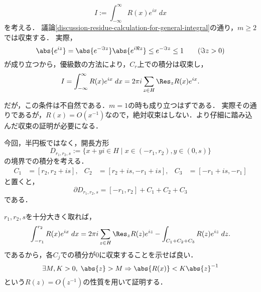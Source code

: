 \documentclass[uplatex, dvipdfmx]{jsreport}
\begin{document}
\begin{discussion}[$R=O(x^{-1})$の時]\label{discussion-general-integral-case-O(n^-1)}
    \[I:=\int^\infty_{-\infty}R(x)e^{ix}\;dx\]
    を考える．
    議論\ref{discussion-residue-calculation-for-general-integral}の通り，$m\ge 2$
    では収束する．
    実際，
    \[\abs{e^{iz}}=\abs{e^{-\Im z}}\abs{e^{i\Re z}}\le e^{-\Im z}\le 1\qquad(\Im z>0)\]
    が成り立つから，優級数の方法により，$C_r$上での積分は収束し，
    \[I=\int^\infty_{-\infty}R(x)e^{ix}\;dx=2\pi i\sum_{z\in H}\Res_zR(x)e^{ix}.\]

    だが，この条件は不自然である．$m=1$の時も成り立つはずである．
    実際その通りであるが，$R(x)=O(x^{-1})$なので，絶対収束はしない．より仔細に踏み込んだ収束の証明が必要になる．

    今回，半円板ではなく，開長方形
    \[D_{r_1,r_2,s}:=\{x+yi\in H\mid x\in(-r_1,r_2),y\in(0,s)\}\]
    の境界での積分を考える．
    \begin{align*}
        C_1&=[r_2,r_2+is],&C_2&=[r_2+is,-r_1+is],&C_3&=[-r_1+is,-r_1]
    \end{align*}
    と置くと，
    \[\partial D_{r_1,r_2,s}=[-r_1,r_2]+C_1+C_2+C_3\]
    である．
    \begin{center}
    \end{center}
    $r_1,r_2,s$を十分大きく取れば，
    \[\int^{r_2}_{-r_1}R(x)e^{ix}\;dx=2\pi i\sum_{z\in H}\Res_zR(z)e^{iz}-\int_{C_1+C_2+C_3}R(z)e^{iz}\;dz.\]
    であるから，各$C_j$での積分が$0$に収束することを示せば良い．
    \[\exists M,K>0,\;\abs{z}>M\Rightarrow\abs{R(x)}<K\abs{z}^{-1}\]
    という$R(z)=O(z^{-1})$の性質を用いて証明する．

\end{discussion}
\end{document}
